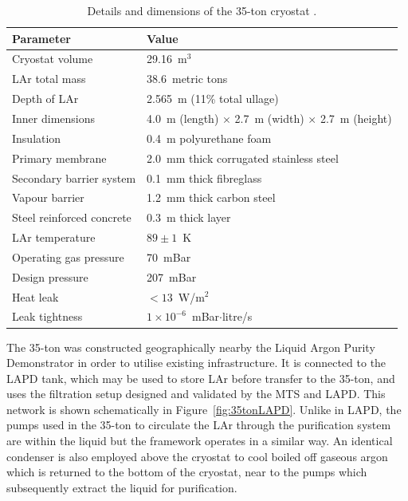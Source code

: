 \begin{table}
  \caption[Details and dimensions of the 35-ton cryostat.]{Details and dimensions of the 35-ton cryostat \cite{35tonPhaseI2015}.}
  \label{tab:35tonCryostat}
  \centering
  \begin{tabular}{ l l }
    \toprule
    Parameter & Value \\
    \midrule
    Cryostat volume           & 29.16~m$^3$ \\
    LAr total mass            & 38.6~metric tons \\
    Depth of LAr              & 2.565~m (11\% total ullage) \\
    Inner dimensions          & 4.0~m (length) $\times$ 2.7~m (width) $\times$ 2.7~m (height) \\
    Insulation                & 0.4~m polyurethane foam \\
    Primary membrane          & 2.0~mm thick corrugated stainless steel \\
    Secondary barrier system  & 0.1~mm thick fibreglass \\
    Vapour barrier             & 1.2~mm thick carbon steel \\
    Steel reinforced concrete & 0.3~m thick layer \\
    LAr temperature           & $89\pm1$~K \\
    Operating gas pressure    & 70~mBar \\
    Design pressure           & 207~mBar \\
    Heat leak                 & $<13$~W/m$^2$ \\
    Leak tightness            & $1\times10^{-6}$~mBar$\cdot$litre/s \\
    \bottomrule
  \end{tabular}
\end{table}

The 35-ton was constructed geographically nearby the Liquid Argon Purity Demonstrator in order to utilise existing infrastructure.  It is connected to the LAPD tank, which may be used to store LAr before transfer to the 35-ton, and uses the filtration setup designed and validated by the MTS and LAPD.  This network is shown schematically in Figure~\ref{fig:35tonLAPD}.  Unlike in LAPD, the pumps used in the 35-ton to circulate the LAr through the purification system are within the liquid but the framework operates in a similar way.  An identical condenser is also employed above the cryostat to cool boiled off gaseous argon which is returned to the bottom of the cryostat, near to the pumps which subsequently extract the liquid for purification.

